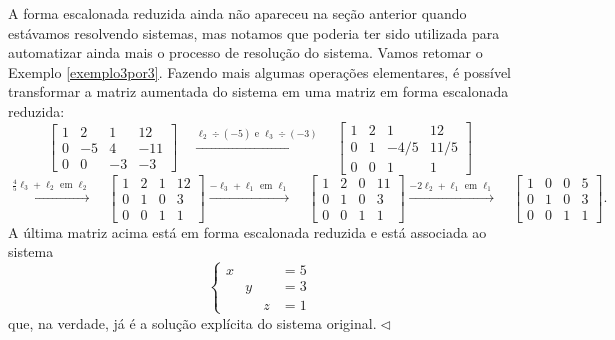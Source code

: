 \begin{obs}
A forma escalonada reduzida ainda não apareceu na seção anterior quando estávamos resolvendo sistemas, mas notamos que poderia ter sido utilizada para automatizar ainda mais o processo de resolução do sistema. Vamos retomar o Exemplo \ref{exemplo3por3}. Fazendo mais algumas operações elementares, é possível transformar a matriz aumentada do sistema em uma matriz em forma escalonada reduzida:
\begin{equation}
\left[
  \begin{array}{ccc|c}
    1 &  2 &  1 &  12 \\
    0 & -5 &  4 & -11 \\
    0 &  0 & -3 & -3
  \end{array}
\right]
\quad \xrightarrow{\ell_2 \div (-5)  \text{ e } \ell_3\div (-3)} \quad
\left[
  \begin{array}{ccc|c}
    1 &  2 &  1   &  12 \\
    0 & 1  & -4/5 & 11/5 \\
    0 &  0 &  1   &  1
  \end{array}
\right]
\end{equation}
\begin{equation}
\xrightarrow{\frac{4}{5}\ell_3 + \ell_2 \text{ em } \ell_2} \quad
\left[
  \begin{array}{ccc|c}
    1 &  2 &  1   &  12 \\
    0 & 1  &  0   &  3 \\
    0 &  0 &  1   &  1
  \end{array}
\right]
\xrightarrow{-\ell_3 + \ell_1 \text{ em } \ell_1} \quad
\left[
  \begin{array}{ccc|c}
    1 &  2 &  0   &  11 \\
    0 &  1 &  0   &  3 \\
    0 &  0 &  1   &  1
  \end{array}
\right]
\xrightarrow{-2\ell_2 + \ell_1 \text{ em } \ell_1} \quad
\left[
  \begin{array}{ccc|c}
    1 &  0 &  0   &  5 \\
    0 &  1 &  0   &  3 \\
    0 &  0 &  1   &  1
  \end{array}
\right].
\end{equation} A última matriz acima está em forma escalonada reduzida e está associada ao sistema
\begin{equation}
\left\{
  \begin{array}{llll}
    x &   &   & = 5 \\
      & y &   & = 3 \\
      &   & z & = 1
  \end{array}
\right.
\end{equation} que, na verdade, já é a solução explícita do sistema original$.\lhd$
\end{obs}

